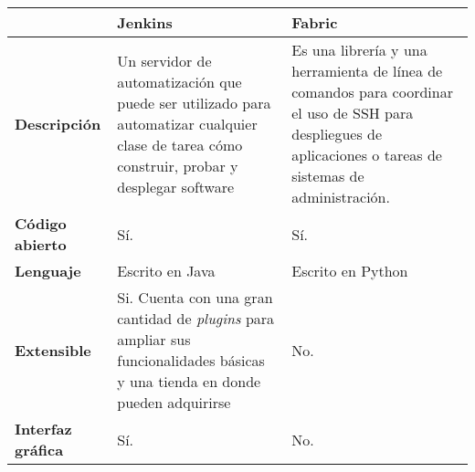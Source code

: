 \begin{table}[h]
\centering
\begin{tabular}{| p{} | p{} | p{} |}
\hline
                                                 & \textbf{Jenkins}                                                                                                                                   & \textbf{Fabric}                                                                                                                                              \\ \hline
\textbf{Descripción}                             & Un servidor de automatización que puede ser utilizado para automatizar cualquier clase de tarea cómo construir, probar y desplegar software        & Es una librería y una herramienta de línea de comandos para coordinar el uso de SSH para despliegues de aplicaciones o tareas de sistemas de administración. \\ \hline
\textbf{Código abierto}                          & Sí.                                                                                                                                                & Sí.                                                                                                                                                          \\ \hline
\textbf{Lenguaje}                                & Escrito en Java                                                                                                                                    & Escrito en Python                                                                                                                                            \\ \hline
\textbf{Extensible}                              & Si. Cuenta con una gran cantidad de \textit{plugins} para ampliar sus funcionalidades básicas y una tienda en donde pueden adquirirse                       & No.                                                                                                                                                          \\ \hline
\textbf{Interfaz gráfica}                        & Sí.                                                                                                                                                & No.                                                                                                                                                          \\ \hline

\end{tabular}
\end{table}
